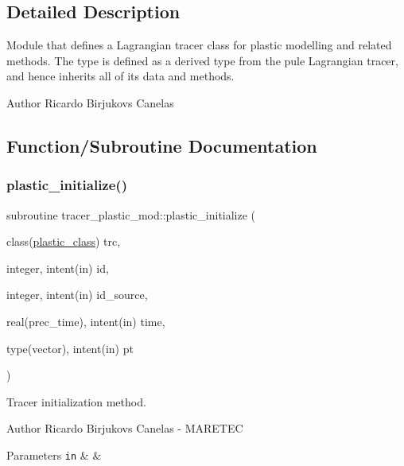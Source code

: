 \subsection{Detailed Description}
Module that defines a Lagrangian tracer class for plastic modelling and related methods. The type is defined as a derived type from the pule Lagrangian tracer, and hence inherits all of it\textquotesingle{}s data and methods. 

\begin{DoxyAuthor}{Author}
Ricardo Birjukovs Canelas 
\end{DoxyAuthor}


\subsection{Function/\+Subroutine Documentation}
\mbox{\label{namespacetracer__plastic__mod_a42882cd86cfe30f341d8150582a664a9}} 
\subsubsection{\texorpdfstring{plastic\+\_\+initialize()}{plastic\_initialize()}}
{\footnotesize\ttfamily subroutine tracer\+\_\+plastic\+\_\+mod\+::plastic\+\_\+initialize (\begin{DoxyParamCaption}\item[{class(\hyperlink{structtracer__plastic__mod_1_1plastic__class}{plastic\+\_\+class})}]{trc,  }\item[{integer, intent(in)}]{id,  }\item[{integer, intent(in)}]{id\+\_\+source,  }\item[{real(prec\+\_\+time), intent(in)}]{time,  }\item[{type(vector), intent(in)}]{pt }\end{DoxyParamCaption})\hspace{0.3cm}{\ttfamily [private]}}



Tracer initialization method. 

\begin{DoxyAuthor}{Author}
Ricardo Birjukovs Canelas -\/ M\+A\+R\+E\+T\+EC 
\end{DoxyAuthor}

\begin{DoxyParams}[1]{Parameters}
\mbox{\tt in}  & {\em } & \\
\hline
\end{DoxyParams}
